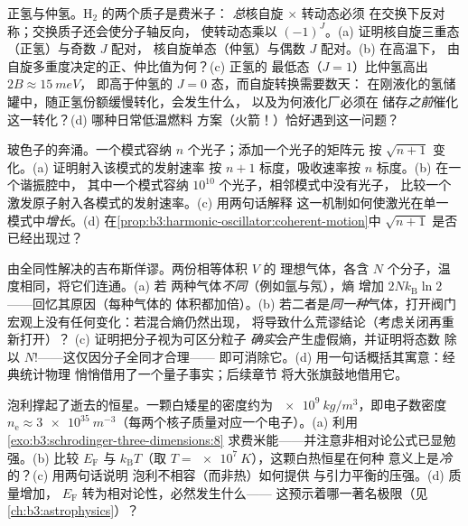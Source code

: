 \begin{exercise}[$\star\star$]\label{exo:b3:identical-particles:8}
正氢与仲氢。H$_2$ 的两个质子是费米子：
\emph{总}核自旋 $\times$ 转动态必须
在交换下反对称；交换质子还会使分子轴反向，
使转动态乘以
$(-1)^J$。(a) 证明核自旋三重态（正氢）与奇数 $J$ 配对，
核自旋单态（仲氢）与偶数 $J$ 配对。(b) 在高温下，
由自旋多重度决定的正、仲比值为何？(c) 正氢的
最低态（$J = 1$）比仲氢高出 $2B \approx \qty{15}{meV}$，
即高于仲氢的 $J = 0$ 态，而自旋转换需要数天：
在刚液化的氢储罐中，随正氢份额缓慢转化，会发生什么，
以及为何液化厂必须在
储存\emph{之前}催化这一转化？(d) 哪种日常低温燃料
方案（火箭！）恰好遇到这一问题？
\end{exercise}

\begin{exercise}[$\star\star$]\label{exo:b3:identical-particles:9}
玻色子的奔涌。一个模式容纳 $n$ 个光子；添加一个光子的矩阵元
按 $\sqrt{n+1}$ 变化。(a) 证明射入该模式的发射速率
按 $n + 1$ 标度，吸收速率按 $n$ 标度。(b) 在一个谐振腔中，
其中一个模式容纳 $10^{10}$ 个光子，相邻模式中没有光子，
比较一个激发原子射入各模式的发射速率。(c) 用两句话解释
这一机制如何使激光在单一
模式中\emph{增长}。(d) 在\cref{prop:b3:harmonic-oscillator:coherent-motion}中
$\sqrt{n+1}$ 是否已经出现过？
\end{exercise}

\begin{exercise}[$\star\star\star$]\label{exo:b3:identical-particles:10}
由全同性解决的吉布斯佯谬。两份相等体积 $V$ 的
理想气体，各含 $N$ 个分子，温度相同，将它们连通。(a) 若
两种气体\emph{不同}（例如氩与氖），熵
增加 $2Nk_{\text{B}}\ln2$——回忆其原因（每种气体的
体积都加倍）。(b) 若二者是\emph{同一种}气体，打开阀门
宏观上没有任何变化：若混合熵仍然出现，
将导致什么荒谬结论（考虑关闭再重新打开）？
(c) 证明把分子视为可区分粒子
\emph{确实}会产生虚假熵，并证明将态数
除以 $N!$——这仅因分子全同才合理——
即可消除它。(d) 用一句话概括其寓意：经典统计物理
悄悄借用了一个量子事实；后续章节
将大张旗鼓地借用它。
\end{exercise}

\begin{exercise}[$\star\star\star$]\label{exo:b3:identical-particles:11}
泡利撑起了逝去的恒星。一颗白矮星的密度约为
$\qty{e9}{kg/m^3}$，即电子数密度 $n_{\text{e}} \approx
\qty{3e35}{m^{-3}}$（每两个核子质量对应一个电子）。(a)
利用
\cref{exo:b3:schrodinger-three-dimensions:8}
求费米能——并注意非相对论公式已显勉强。(b) 比较
$E_{\text{F}}$ 与 $k_{\text{B}}T$（取 $T = \qty{e7}{K}$），这颗白热恒星在何种
意义上是\emph{冷}的？(c) 用两句话说明
泡利不相容（而非热）如何提供
与引力平衡的压强。(d) 质量增加，
$E_{\text{F}}$ 转为相对论性，必然发生什么——
这预示着哪一著名极限（见\cref{ch:b3:astrophysics}）？
\end{exercise}

